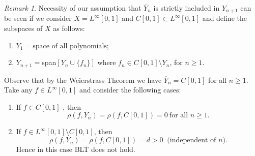 \documentclass[12pt, reqno]{amsart}
\theoremstyle{definition}
\newtheorem{example}[theorem]{Example}
\theoremstyle{remark}
\newtheorem{remark}[theorem]{Remark}
\numberwithin{equation}{section}
\begin{document}
\begin{remark}
Necessity of our assumption that $\overline{Y}_n $ is strictly included
in $Y_{n+1}$ can be seen if we consider
 $X = L^{\infty}[0,1]$ and $C[0,1] \subset L^{\infty} [0,1]$ and define the subspaces  of $X$ as follows:

\begin{enumerate}
\item

 $ Y_1 =  \mbox{space of all polynomials}$;
\item
 $ Y_{n+1} = $span$[Y_n \cup \{f_{n}\}]$
where $f_{n} \in C[0,1] \setminus Y_n$, for $n\ge1$.
\end{enumerate}
Observe that by the Weierstrass Theorem we have $\overline {Y}_n = C[0,1] $ for all $n \ge1$.
Take any  $ f \in L^{\infty}[0,1]$ and consider the following cases:
\begin{enumerate}
\renewcommand{\labelenumi}{\alph{enumi})}
\item If  $ f \in C[0,1]$ , then
$$
\rho (f,Y_n) = \rho(f,C[0,1]) = 0~\mbox{for all $n\ge1$}.
$$
\item If $ f \in L^{\infty}[0,1] \setminus C[0,1] $, then
$$
\rho(f, Y_n) = \rho(f, C[0,1]) = d > 0~ \mbox{ (independent of $n$)}.
$$
Hence in this case BLT does not hold.
\end{enumerate}
\end{remark}
\fi
\end{document}
